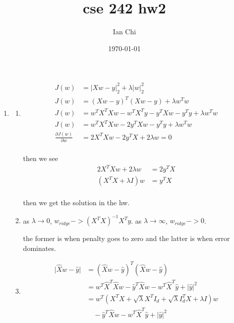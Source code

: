 \documentclass{article}
\title{cse 242 hw2}
\author{Ian Chi}
\date{\today}
\begin{document}
\maketitle

\section{}
\begin{enumerate}
    \item 
    \begin{enumerate}
        \item \begin{equation}
        \begin{split}
                J(w)&=\Big|Xw-y\Big|_2^2 + \lambda\Big|w\Big|_2^2\\
                J(w)&=(Xw-y)^T(Xw-y) + \lambda w^T w\\
                J(w)&=w^TX^TXw - w^TX^Ty - y^T Xw - y^Ty + \lambda w^T w\\
                J(w)&=w^TX^TXw - 2y^T Xw - y^Ty + \lambda w^T w\\
                \frac{\partial J(w)}{\partial w}&=2X^TXw -2y^TX + 2\lambda w = 0\\
        \end{split}\end{equation}
        
        then we see 
        \begin{equation}
            \begin{split}
                2X^TXw  + 2\lambda w &= 2y^TX\\
                (X^TX  + \lambda I )w &= y^TX\\
            \end{split}
        \end{equation}
        
        then we get the solution in the hw. 

        \item as \(\lambda\to 0\), \(w_{ridge}->(X^TX)^{-1}X^Ty\).  as \(\lambda\to \infty\), \(w_{ridge}->0\). 
        
        the former is when penalty goes to zero and the latter is when error dominates. 

        \item 

        \begin{equation}
            \begin{split}
                \Big| \hat X w - \hat y\Big| &= (\hat X w - \hat y)^T (\hat X w - \hat y)\\
                &= w^T\hat X^T \hat X w - \hat y^T \hat X w - w^T \hat X^T \hat y + \Big|\hat y\Big|^2\\
                &= w^T(X^T X + \sqrt{\lambda}X^TI_d + \sqrt{\lambda}I_d^TX + \lambda I) w \\
                & \quad - \hat y^T \hat X w - w^T \hat X^T \hat y + \Big|\hat y\Big|^2\\
            \end{split}
        \end{equation}


\end{enumerate}
\end{enumerate}
\end{document}
